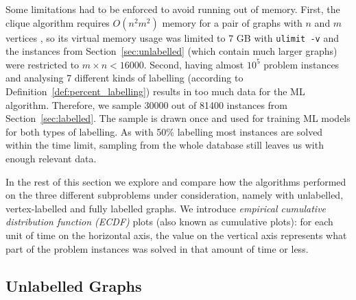 \documentclass{l4proj}
\theoremstyle{definition}
\theoremstyle{remark}
\begin{document}
Some limitations had to be enforced to avoid running out of memory. First, the
clique algorithm requires $O(n^2m^2)$ memory for a pair of graphs with $n$ and
$m$ vertices \cite{DBLP:conf/aaai/HoffmannMR17, DBLP:conf/cp/McCreeshNPS16}, so
its virtual memory usage was limited to 7 GB with \texttt{ulimit -v} and the
instances from Section~\ref{sec:unlabelled} (which contain much larger graphs)
were restricted to $m \times n < \num{16000}$. Second, having almost $10^5$
problem instances and analysing 7 different kinds of labelling (according to
Definition~\ref{def:percent_labelling}) results in too much data for the ML
algorithm. Therefore, we sample \num{30000} out of \num{81400} instances from
Section~\ref{sec:labelled}. The sample is drawn once and used for training ML
models for both types of labelling. As with 50\% labelling most instances are
solved within the time limit, sampling from the whole database still leaves us
with enough relevant data.

In the rest of this section we explore and compare how the algorithms performed
on the three different subproblems under consideration, namely with unlabelled,
vertex-labelled and fully labelled graphs. We introduce
\emph{empirical cumulative distribution function (ECDF)}
plots \cite{10.2307/2334448} (also known as cumulative plots): for each unit of
time on the horizontal axis, the value on the vertical axis represents what part
of the problem instances was solved in that amount of time or less.

\subsection{Unlabelled Graphs}
\end{document}
